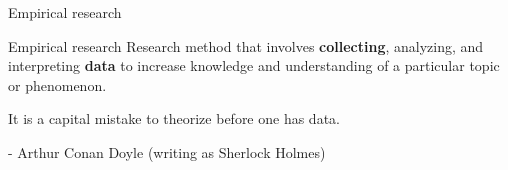 \documentclass[aspectratio=169]{beamer}
\begin{document}
\begin{frame}{Empirical research}

\begin{coolblock}{Empirical research}
    Research method that involves \textbf{collecting}, analyzing, and interpreting \textbf{data} to increase knowledge and understanding of a particular topic or phenomenon.
\end{coolblock}
\vspace{0.5cm}

\begin{center}
    \begin{tcolorbox}[enhanced,sharp corners,
        width=10.2cm,
        colback=white,
        overlay={
            \node[anchor=north west,fill=white,draw=white,circle,inner sep=1pt] 
            at ([xshift=-0.17cm,yshift=0.2cm]frame.north west) {\faQuoteLeft};
            \node[anchor=south east,fill=white,draw=white,circle,inner sep=1pt] 
            at ([xshift=0.17cm,yshift=-0.2cm]frame.south east) {\faQuoteRight};
        }
    ]
    It is a capital mistake to theorize before one has data. \\
    \vspace{0cm}

    {\small - Arthur Conan Doyle (writing as Sherlock Holmes)}
    \end{tcolorbox}
\end{center}
    
\end{frame}
\end{document}
